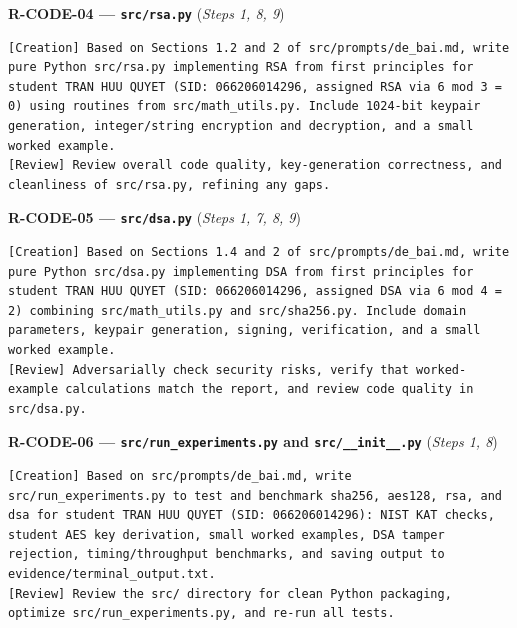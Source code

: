 \textbf{R-CODE-04 --- \texttt{src/rsa.py}} (\textit{Steps 1, 8, 9})
\begin{lstlisting}[style=promptstyle]
[Creation] Based on Sections 1.2 and 2 of src/prompts/de_bai.md, write pure Python src/rsa.py implementing RSA from first principles for student TRAN HUU QUYET (SID: 066206014296, assigned RSA via 6 mod 3 = 0) using routines from src/math_utils.py. Include 1024-bit keypair generation, integer/string encryption and decryption, and a small worked example.
[Review] Review overall code quality, key-generation correctness, and cleanliness of src/rsa.py, refining any gaps.
\end{lstlisting}

\textbf{R-CODE-05 --- \texttt{src/dsa.py}} (\textit{Steps 1, 7, 8, 9})
\begin{lstlisting}[style=promptstyle]
[Creation] Based on Sections 1.4 and 2 of src/prompts/de_bai.md, write pure Python src/dsa.py implementing DSA from first principles for student TRAN HUU QUYET (SID: 066206014296, assigned DSA via 6 mod 4 = 2) combining src/math_utils.py and src/sha256.py. Include domain parameters, keypair generation, signing, verification, and a small worked example.
[Review] Adversarially check security risks, verify that worked-example calculations match the report, and review code quality in src/dsa.py.
\end{lstlisting}

\textbf{R-CODE-06 --- \texttt{src/run\_experiments.py} and \texttt{src/\_\_init\_\_.py}} (\textit{Steps 1, 8})
\begin{lstlisting}[style=promptstyle]
[Creation] Based on src/prompts/de_bai.md, write src/run_experiments.py to test and benchmark sha256, aes128, rsa, and dsa for student TRAN HUU QUYET (SID: 066206014296): NIST KAT checks, student AES key derivation, small worked examples, DSA tamper rejection, timing/throughput benchmarks, and saving output to evidence/terminal_output.txt.
[Review] Review the src/ directory for clean Python packaging, optimize src/run_experiments.py, and re-run all tests.
\end{lstlisting}
